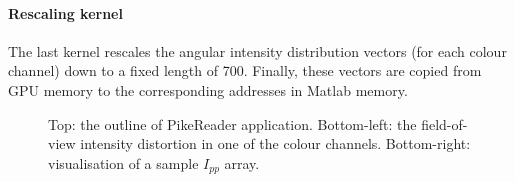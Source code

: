 \documentclass[12pt,dvips]{elsarticle}
\begin{document}
\paragraph{Rescaling kernel} The last kernel rescales the angular intensity distribution vectors (for each colour channel)
down to a fixed length of 700. Finally, these vectors are copied from GPU memory to the corresponding addresses in Matlab
memory.
\begin{figure}[h!t!b!]
\caption{Top: the outline of PikeReader application. Bottom-left: the field-of-view intensity distortion in one of the
colour channels. Bottom-right: visualisation of a sample $I_{pp}$ array.}\label{code+results}
\end{figure}
\end{document}
